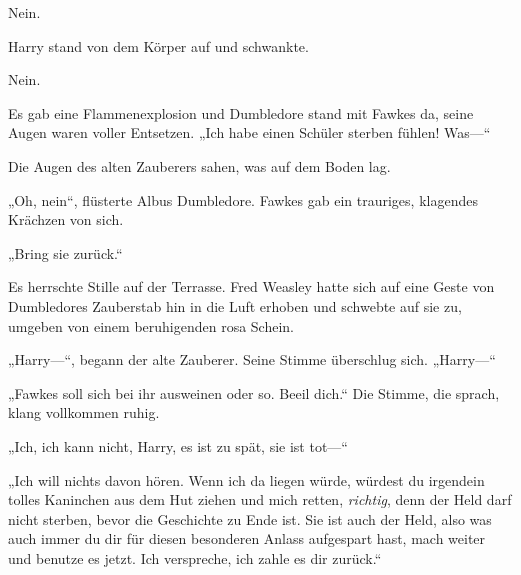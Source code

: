 Nein.

Harry stand von dem Körper auf und schwankte.

Nein.

Es gab eine Flammenexplosion und Dumbledore stand mit Fawkes da, seine Augen waren voller Entsetzen. „Ich habe einen Schüler sterben fühlen! Was—“

Die Augen des alten Zauberers sahen, was auf dem Boden lag.

„Oh, nein“, flüsterte Albus Dumbledore. Fawkes gab ein trauriges, klagendes Krächzen von sich.

„Bring sie zurück.“

Es herrschte Stille auf der Terrasse. Fred Weasley hatte sich auf eine Geste von Dumbledores Zauberstab hin in die Luft erhoben und schwebte auf sie zu, umgeben von einem beruhigenden rosa Schein.

„Harry—“, begann der alte Zauberer. Seine Stimme überschlug sich. „Harry—“

„Fawkes soll sich bei ihr ausweinen oder so. Beeil dich.“ Die Stimme, die sprach, klang vollkommen ruhig.

„Ich, ich kann nicht, Harry, es ist zu spät, sie ist tot—“

„Ich will nichts davon hören. Wenn ich da liegen würde, würdest du irgendein tolles Kaninchen aus dem Hut ziehen und mich retten, \emph{richtig}, denn der Held darf nicht sterben, bevor die Geschichte zu Ende ist. Sie ist auch der Held, also was auch immer du dir für diesen besonderen Anlass aufgespart hast, mach weiter und benutze es jetzt. Ich verspreche, ich zahle es dir zurück.“

